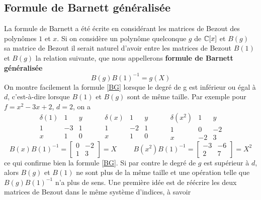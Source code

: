 \documentclass{standalone}
\begin{document}
\subsection{Formule de Barnett généralisée}
\label{Bar_gen}
La formule de Barnett a été écrite en considérant les matrices de Bezout des polynômes $1$ et $x$.
Si on considère un polynôme quelconque $g$ de $\mathbb{C}[x]$ et $B(g)$ sa matrice de Bezout il serait naturel d'avoir entre les matrices de Bezout $B(1)$ et $B(g)$ la relation suivante, que nous appellerons {\bf formule de Barnett généralisée}
\begin{equation}
	\label{BG}
	B(g)B(1)^{-1} = g(X)
\end{equation}
On montre facilement la formule \ref{BG} lorsque le degré de g est inférieur ou égal à $d$, c'est-à-dire lorsque $B(1)$ et $B(g)$ sont de même taille. Par exemple pour $f = x^2 - 3x + 2$, $d = 2$, on a
$$
\begin{array}{c|cc}
	\delta(1) & 1 & y \\
	\hline
	1 & -3 & 1 \\
	x & 1 & 0
\end{array}
\hspace{1cm}
\begin{array}{c|cc}
	\delta(x) & 1 & y \\
	\hline
	1 & -2 & 1 \\
	x & 1 & 0
\end{array}
\hspace{1cm}
\begin{array}{c|cc}
	\delta(x^2) & 1 & y \\
	\hline
	1 & 0 & -2 \\
	x & -2 & 3
\end{array}
$$
\begin{equation}
	B(x)B(1)^{-1} =
	\begin{bmatrix}
		0 & -2 \\
		1 & 3
	\end{bmatrix}
	= X
	\hspace{1cm}
	B(x^2)B(1)^{-1} =
	\begin{bmatrix}
		-3 & -6 \\
		2 & 7
	\end{bmatrix}
	= X^2
\end{equation}
ce qui confirme bien la formule \ref{BG}.
Si par contre le degré de $g$ est supérieur à $d$, alors $B(g)$ et $B(1)$ ne sont plus de la même taille et une opération telle que $B(g)B(1)^{-1}$ n'a plus de sens. Une première idée est de réécrire les deux matrices de Bezout dans le même système d'indices, à savoir
\end{document}
